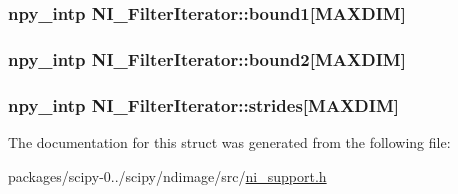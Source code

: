 \subsubsection[{bound1}]{\setlength{\rightskip}{0pt plus 5cm}npy\+\_\+intp N\+I\+\_\+\+Filter\+Iterator\+::bound1\mbox{[}{\bf M\+A\+X\+D\+I\+M}\mbox{]}}\label{structNI__FilterIterator_a05e78616726cede7ef84b577cf8522fd}
\hypertarget{structNI__FilterIterator_a0c234e20b08ecb9cde20c3b1790c6958}{}
\subsubsection[{bound2}]{\setlength{\rightskip}{0pt plus 5cm}npy\+\_\+intp N\+I\+\_\+\+Filter\+Iterator\+::bound2\mbox{[}{\bf M\+A\+X\+D\+I\+M}\mbox{]}}\label{structNI__FilterIterator_a0c234e20b08ecb9cde20c3b1790c6958}
\hypertarget{structNI__FilterIterator_a50a693fb2d87ac49ebee590fea850e52}{}
\subsubsection[{strides}]{\setlength{\rightskip}{0pt plus 5cm}npy\+\_\+intp N\+I\+\_\+\+Filter\+Iterator\+::strides\mbox{[}{\bf M\+A\+X\+D\+I\+M}\mbox{]}}\label{structNI__FilterIterator_a50a693fb2d87ac49ebee590fea850e52}


The documentation for this struct was generated from the following file\+:\begin{DoxyCompactItemize}
\item 
packages/scipy-\/0../scipy/ndimage/src/\hyperlink{ni__support_8h}{ni\+\_\+support.\+h}\end{DoxyCompactItemize}
